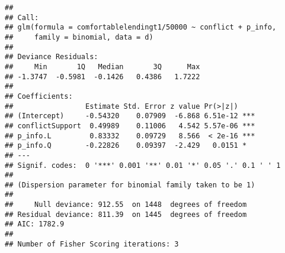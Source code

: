 \documentclass[]{article}
\begin{document}
\begin{verbatim}
## 
## Call:
## glm(formula = comfortablelendingt1/50000 ~ conflict + p_info, 
##     family = binomial, data = d)
## 
## Deviance Residuals: 
##     Min       1Q   Median       3Q      Max  
## -1.3747  -0.5981  -0.1426   0.4386   1.7222  
## 
## Coefficients:
##                 Estimate Std. Error z value Pr(>|z|)    
## (Intercept)     -0.54320    0.07909  -6.868 6.51e-12 ***
## conflictSupport  0.49989    0.11006   4.542 5.57e-06 ***
## p_info.L         0.83332    0.09729   8.566  < 2e-16 ***
## p_info.Q        -0.22826    0.09397  -2.429   0.0151 *  
## ---
## Signif. codes:  0 '***' 0.001 '**' 0.01 '*' 0.05 '.' 0.1 ' ' 1
## 
## (Dispersion parameter for binomial family taken to be 1)
## 
##     Null deviance: 912.55  on 1448  degrees of freedom
## Residual deviance: 811.39  on 1445  degrees of freedom
## AIC: 1782.9
## 
## Number of Fisher Scoring iterations: 3
\end{verbatim}
\end{document}
